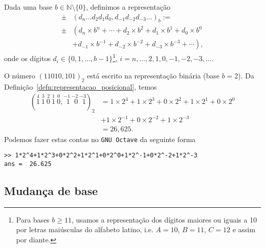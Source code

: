 \begin{defn}\label{defn:representacao_posicional}
  Dada uma base $b\in\mathbb{N}\setminus \{0\}$, definimos a representação
  \begin{align}
    \pm &(d_n\ldots d_2d_1d_0,d_{-1}d_{-2}d_{-3}\ldots)_{b} := \\
    \pm &\left(d_n\times b^n + \cdots + d_2\times b^2 + d_1\times b^1 + d_0\times b^0\right. \\
      &\left. + d_{-1}\times b^{-1} + d_{-2}\times b^{-2} + d_{-3}\times b^{-3} + \cdots\right),
  \end{align}
onde os dígitos $d_i\in\{0, 1, \dotsc, b-1\}$\footnote{Para bases $b\geq 11$, usamos a representação dos dígitos maiores ou iguais a 10 por letras maiúsculas do alfabeto latino, i.e. $A=10$, $B=11$, $C=12$ e assim por diante.}, $i=n, \dotsc, 2, 1, 0, -1, -2, -3, \ldots$.
\end{defn}

\begin{ex}\label{ex:base_binaria}
  O número $(11010,101)_2$ está escrito na representação binária (base $b=2$). Da Definição~\ref{defn:representacao_posicional}, temos
  \begin{align}
    (\stackrel{4}{1}~\stackrel{3}{1}~\stackrel{2}{0}~\stackrel{1}{1}~\stackrel{0}{0},\stackrel{-1}{~\,1}~\stackrel{-2}{~\,0}~\stackrel{-3}{~\,1})_2 &= 1\times 2^4 + 1\times 2^3 + 0\times 2^2 + 1\times 2^1 + 0\times 2^0\\
    &+ 1\times 2^{-1} + 0\times 2^{-2} + 1\times 2^{-3}\\
    &= 26,625.
  \end{align}
\ifisoctave
Podemos fazer estas contas no \verb+GNU Octave+ da seguinte forma
\begin{verbatim}
>> 1*2^4+1*2^3+0*2^2+1*2^1+0*2^0+1*2^-1+0*2^-2+1*2^-3
ans =  26.625
\end{verbatim}
\fi
\end{ex}

\subsection{Mudança de base}

